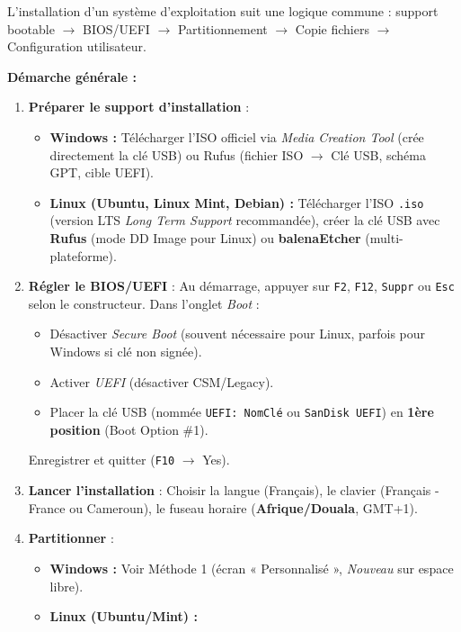 \documentclass[11pt]{article}
\newcommand{\cle}[1]{{\popxbold\color{popdark}#1}}
\begin{document}
\begin{methode}
L'\cle{installation d'un système d'exploitation} suit une logique commune : support bootable $\rightarrow$ BIOS/UEFI $\rightarrow$ Partitionnement $\rightarrow$ Copie fichiers $\rightarrow$ Configuration utilisateur.

\textbf{Démarche générale :}
\begin{enumerate}
  \item \textbf{Préparer le support d'installation} :
        \begin{itemize}
          \item \textbf{Windows :} Télécharger l'ISO officiel via \emph{Media Creation Tool} (crée directement la clé USB) ou Rufus (fichier ISO $\rightarrow$ Clé USB, schéma GPT, cible UEFI).
          \item \textbf{Linux (Ubuntu, Linux Mint, Debian) :} Télécharger l'ISO \texttt{.iso} (version LTS \emph{Long Term Support} recommandée), créer la clé USB avec \textbf{Rufus} (mode DD Image pour Linux) ou \textbf{balenaEtcher} (multi-plateforme).
        \end{itemize}
  \item \textbf{Régler le BIOS/UEFI} : Au démarrage, appuyer sur \texttt{F2}, \texttt{F12}, \texttt{Suppr} ou \texttt{Esc} selon le constructeur. Dans l'onglet \emph{Boot} :
        \begin{itemize}
          \item Désactiver \emph{Secure Boot} (souvent nécessaire pour Linux, parfois pour Windows si clé non signée).
          \item Activer \emph{UEFI} (désactiver CSM/Legacy).
          \item Placer la clé USB (nommée \texttt{UEFI: NomClé} ou \texttt{SanDisk UEFI}) en \textbf{1ère position} (Boot Option \#1).
        \end{itemize}
        Enregistrer et quitter (\texttt{F10} $\rightarrow$ Yes).
  \item \textbf{Lancer l'installation} : Choisir la langue (Français), le clavier (Français - France ou Cameroun), le fuseau horaire (\textbf{Afrique/Douala}, GMT+1).
  \item \textbf{Partitionner} :
        \begin{itemize}
          \item \textbf{Windows :} Voir Méthode 1 (écran « Personnalisé », \emph{Nouveau} sur espace libre).
          \item \textbf{Linux (Ubuntu/Mint) :}

\end{itemize}
\end{enumerate}
\end{methode}
\end{document}
